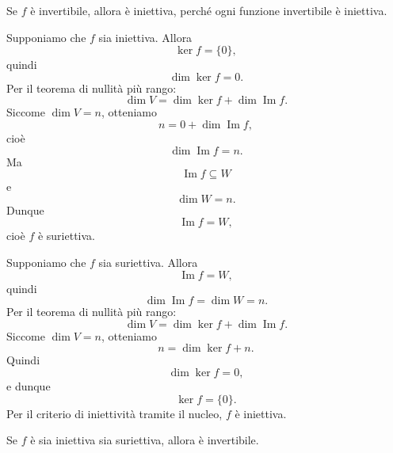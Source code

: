 \documentclass[a4paper]{article}
\begin{document}
\begin{snippetproof}{}
    \begin{iffproof}
    \item[\((1)\Rightarrow(2)\)]
        Se \(f\) è invertibile, allora è iniettiva, perché ogni funzione invertibile è iniettiva.

    \item[\((2)\Rightarrow(3)\)]
        Supponiamo che \(f\) sia iniettiva. Allora
        \[
            \ker f=\{0\},
        \]
        quindi
        \[
            \dim\ker f=0.
        \]
        Per il teorema di nullità più rango:
        \[
            \dim V=\dim\ker f+\dim\operatorname{Im}f.
        \]
        Siccome \(\dim V=n\), otteniamo
        \[
            n=0+\dim\operatorname{Im}f,
        \]
        cioè
        \[
            \dim\operatorname{Im}f=n.
        \]
        Ma
        \[
            \operatorname{Im}f\subseteq W
        \]
        e
        \[
            \dim W=n.
        \]
        Dunque
        \[
            \operatorname{Im}f=W,
        \]
        cioè \(f\) è suriettiva.

    \item[\((3)\Rightarrow(2)\)]
        Supponiamo che \(f\) sia suriettiva. Allora
        \[
            \operatorname{Im}f=W,
        \]
        quindi
        \[
            \dim\operatorname{Im}f=\dim W=n.
        \]
        Per il teorema di nullità più rango:
        \[
            \dim V=\dim\ker f+\dim\operatorname{Im}f.
        \]
        Siccome \(\dim V=n\), otteniamo
        \[
            n=\dim\ker f+n.
        \]
        Quindi
        \[
            \dim\ker f=0,
        \]
        e dunque
        \[
            \ker f=\{0\}.
        \]
        Per il criterio di iniettività tramite il nucleo, \(f\) è iniettiva.

    \item[\((2),(3)\Rightarrow(1)\)]
        Se \(f\) è sia iniettiva sia suriettiva, allora è invertibile.
    \end{iffproof}
\end{snippetproof}
\end{document}

